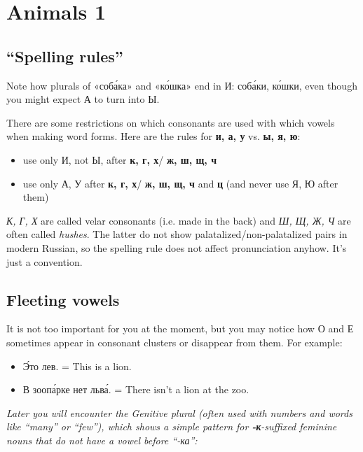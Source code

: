 \chapter{Animals 1}\label{animals-1}

\section{\texorpdfstring{``Spelling
rules''}{Spelling rules}}\label{spelling-rules}

Note how plurals of «соб\'{а}ка» and «к\'{о}шка» end in И: соб\'{а}ки, к\'{о}шки, even
though you might expect А to turn into Ы.

There are some restrictions on which consonants are used with which
vowels when making word forms. Here are the rules for \textbf{и, а, у}
vs. \textbf{ы, я, ю}:

\begin{itemize}
\tightlist
\item
  use only И, not Ы, after \textbf{к, г, х}/ \textbf{ж, ш, щ, ч}
\item
  use only А, У after \textbf{к, г, х}/ \textbf{ж, ш, щ, ч} and
  \textbf{ц} (and never use Я, Ю after them)
\end{itemize}

\emph{К, Г, Х} are called velar consonants (i.e. made in the back) and
\emph{Ш, Щ, Ж, Ч} are often called \emph{hushes}. The latter do not show
palatalized/non-palatalized pairs in modern Russian, so the spelling
rule does not affect pronunciation anyhow. It's just a convention.

\section{Fleeting vowels}\label{fleeting-vowels}

It is not too important for you at the moment, but you may notice how О
and Е sometimes appear in consonant clusters or disappear from them. For
example:

\begin{itemize}
\tightlist
\item
  \'{Э}то лев. = This is a lion.
\item
  В зооп\'{а}рке нет льв\'{а}. = There isn't a lion at the zoo.
\end{itemize}

\emph{Later you will encounter the Genitive plural (often used with
numbers and words like ``many'' or ``few''), which shows a simple
pattern for \textbf{-к}-suffixed feminine nouns that do not have a vowel
before ``-ка'':}

